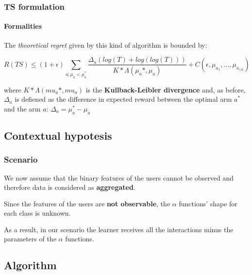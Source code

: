 
\begin{frame}[fragile]

\frametitle{TS formulation}
\framesubtitle{Formalities}

The \textit{theoretical regret} given by this kind of algorithm is bounded by:

\begin{displaymath}
R(TS) \le (1+\epsilon) \sum_{a:\mu_a < \mu_a^*} \frac{\Delta_a(log(T)+log(log(T)))}{K*\Lambda(\mu_a*, \mu_a)} + C (\epsilon, \mu_{a_1} , ... , \mu_{a_{\left|A\right|}})
\end{displaymath}

where $K*\Lambda(mu_a*,mu_a)$ is the \textbf{Kullback-Leibler divergence} and, as before, $\Delta_a$ is defiened as the difference in expected reward between the optimal arm $a^*$ and the arm $a$: $\Delta_a = \mu_a^* - \mu_a$

\end{frame}


\subsection{Contextual hypotesis}


\begin{frame}

\frametitle{Scenario}

We now assume that the binary features of the users cannot be observed and therefore data is considered as \textbf{aggregated}.

Since the features of the users are \textbf{not observable}, the $\alpha$ functions' shape for each class is unknown.

As a result, in our scenario the learner receives all the interactions minus the parameters of the $\alpha$ functions.

\end{frame}


\subsection{Algorithm}


